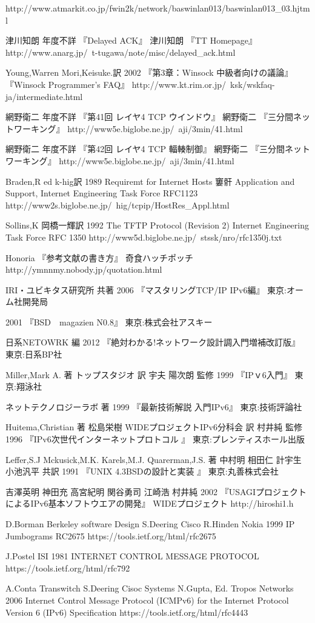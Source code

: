 \begin{thebibliography}{99}
     http://www.atmarkit.co.jp/fwin2k/network/baswinlan013/baswinlan013\_03.hjtml
\item
     津川知朗
	年度不詳 
	『Delayed ACK』
	津川知朗
	『TT Homepage』
     http://www.anarg.jp/~t-tugawa/note/misc/delayed\_ack.html
\item
      Young,Warren
	Mori,Keisuke.訳
	2002
	『第3章：Winsock 中級者向けの議論』 
	『Winsock Programmer's FAQ』
     http://www.kt.rim.or.jp/~ksk/wskfaq-ja/intermediate.html
\item
      網野衛二
	年度不詳
	『第41回 レイヤ4 TCP ウインドウ』
	網野衛二
	『三分間ネットワーキング』
     http://www5e.biglobe.ne.jp/~aji/3min/41.html
\item
      網野衛二
	年度不詳
	『第42回 レイヤ4 TCP 輻輳制御』
	網野衛二
	『三分間ネットワーキング』
     http://www5e.biglobe.ne.jp/~aji/3min/41.html

\item
      Braden,R ed
	k-hig訳
	1989
	Requiremt for Internet Hosts 窶骭 Application and Support, Internet Engineering Task Force RFC1123
      http://www2s.biglobe.ne.jp/~hig/tcpip/HostRes\_Appl.html
\item
      Sollins,K
	岡橋一輝訳
	1992
	The TFTP Protocol (Revision 2) Internet Engineering Task Force RFC 1350
     http://www5d.biglobe.ne.jp/~stssk/nro/rfc1350j.txt
\item
	Honoria
	『参考文献の書き方』
	奇食ハッチポッチ
	http://ymnnmy.nobody.jp/quotation.html
\item
	IRI・ユビキタス研究所 共著
	2006
	『マスタリングTCP/IP IPv6編』
	東京:オーム社開発局
\item
	2001
	『BSD　magazien N0.8』
	東京:株式会社アスキー
\item
	日系NETOWRK 編
	2012
	『絶対わかる!ネットワーク設計調入門増補改訂版』
	東京:日系BP社
\item
	Miller,Mark A. 著
	トップスタジオ 訳
	宇夫 陽次朗 監修
	1999
	『IPｖ6入門』
	東京:翔泳社
\item
	ネットテクノロジーラボ 著
	1999
	『最新技術解説 入門IPv6』
	東京:技術評論社
\item
	Huitema,Christian 著
	松島栄樹 WIDEプロジェクトIPv6分科会 訳
	村井純 監修
	1996
	『IPv6次世代インターネットプロトコル 』
	東京:プレンティスホール出版
\item
	Leffer,S.J Mckusick,M.K. Karels,M.J. Quarerman,J.S. 著
	中村明 相田仁 計宇生 小池汎平 共訳
	1991
	『UNIX 4.3BSDの設計と実装 』
	東京:丸善株式会社
\item
	吉澤英明 神田充 高宮紀明 関谷勇司 江崎浩 村井純
	2002
	『USAGIプロジェクトによるIPv6基本ソフトウエアの開発』
	WIDEプロジェクト
	http://hiroshi1.h
\item
	D.Borman Berkeley software Design S.Deering Cisco  R.Hinden Nokia
	1999
	 IP Jumbograms RC2675
	 https://tools.ietf.org/html/rfc2675
\item
	J.Postel ISI
	1981
	INTERNET CONTROL MESSAGE PROTOCOL
	https://tools.ietf.org/html/rfc792
\item
	A.Conta Transwitch S.Deering Cisoc Systems  N.Gupta, Ed. Tropos Networks
	2006
	Internet Control Message Protocol (ICMPv6) for the Internet Protocol Version 6 (IPv6) Specification
	https://tools.ietf.org/html/rfc4443
\end{thebibliography}